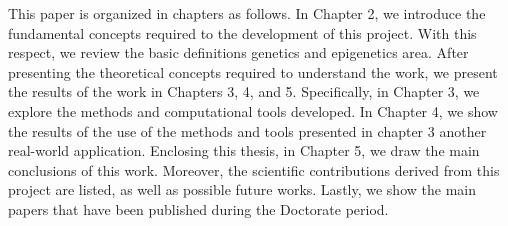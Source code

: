 This paper is organized in chapters as follows. In Chapter 2, we introduce
the fundamental concepts required to the development
of this project. With this respect, we review the basic definitions genetics and epigenetics area. After presenting the theoretical concepts required to understand the work, we present the results of the work in Chapters 3, 4, and 5. Specifically, in
Chapter 3, we explore the methods and computational tools developed.
In Chapter 4, we show the results of the use of the methods and tools presented in chapter 3 another real-world application. Enclosing this thesis, in Chapter 5, we draw the
main conclusions of this work. Moreover, the scientific contributions derived from this
project are listed, as well as possible future works. Lastly, we show the main papers
that have been published during the Doctorate period.

